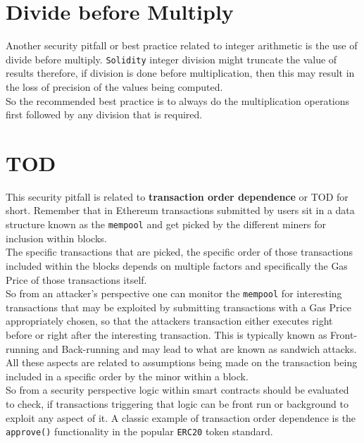 \section{Divide before Multiply}

Another security pitfall or best practice related to integer arithmetic is the use of divide before multiply. \texttt{Solidity} integer division might truncate the value of results therefore, if division is done before multiplication, then this may result in the loss of precision of the values being computed.\\

So the recommended best practice is to always do the multiplication operations first followed by any division that is required.

\section{TOD}

This security pitfall is related to \textbf{transaction order dependence} or TOD for short. Remember that in Ethereum transactions submitted by users sit in a data structure known as the \texttt{mempool} and get picked by the different miners for inclusion within blocks. \\

The specific transactions that are picked, the specific order of those transactions included within the blocks depends on multiple factors and specifically the Gas Price of those transactions itself.\\

So from an attacker's perspective one can monitor the \texttt{mempool} for interesting transactions that may be exploited by submitting transactions with a Gas Price appropriately chosen, so that the attackers transaction either executes right before or right after the interesting transaction. This is typically known as Front-running and Back-running and may lead to what are known as sandwich attacks.\\

All these aspects are related to assumptions being made on the transaction being included in a specific order by the minor within a block. \\

So from a security perspective logic within smart contracts should be evaluated to check, if transactions triggering that logic can be front run or background to exploit any aspect of it. A classic example of transaction order dependence is the \texttt{approve()} functionality in the popular \texttt{ERC20} token standard.

